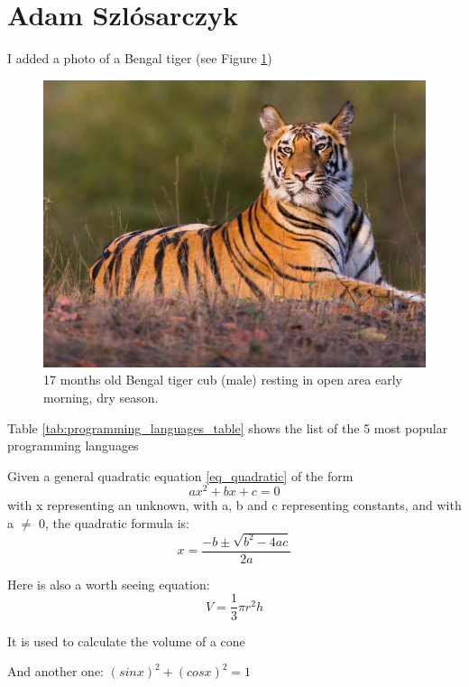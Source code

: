 \section{Adam Szlósarczyk}

I added a photo of a Bengal tiger (see Figure \ref{fig:tiger})

\begin{figure}[htbp]
    \includegraphics[width=\linewidth]{pictures/tiger.jpg}
    \caption{17 months old Bengal tiger cub (male) resting in open area early morning, dry season.}
    \label{fig:tiger}
\end{figure}

\newpage

Table \ref{tab:programming_languages_table} shows the list of the 5 most popular programming languages



Given a general quadratic equation \ref{eq_quadratic} of the form
\begin{equation} \label{eq_quadratic}
ax^2 + bx + c = 0
\end{equation}
with x representing an unknown, with a, b and c representing constants, and with a $\neq$ 0, the quadratic formula is:
\begin{equation}
x = \frac{-b \pm \sqrt{b^2 - 4ac}}{2a}
\end{equation}

Here is also a worth seeing equation: \[V=\frac{1}{3}\pi r^2h\]

It is used to calculate the volume of a cone

And another one: 
$ (sinx)^2 + (cosx)^2 = 1 $

